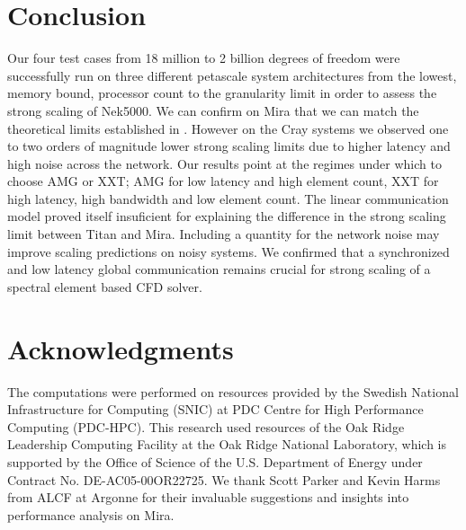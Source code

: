 \documentclass{sig-alternate}
\begin{document}
\section{Conclusion}
Our four test cases from 18 million to 2 billion degrees of freedom were
successfully run on three different petascale system architectures from the
lowest, memory bound, processor count to the granularity limit in order to
assess the strong scaling of Nek5000. We can confirm on Mira that  we can match the theoretical limits established in \cite{fischer:scaling}. However on the Cray systems we observed one to two orders of magnitude
lower strong scaling limits due to higher
latency and high noise across the network. %
Our results point at the regimes under which to choose AMG or
XXT; AMG for low latency and high element count, XXT for high latency, high
bandwidth and low element count. The linear communication model proved itself insuficient for explaining the difference in
the strong scaling limit between Titan and Mira. Including a 
quantity for the network noise may improve scaling predictions on noisy systems.
We confirmed that a synchronized and low latency global communication remains crucial for strong scaling of a spectral element based CFD solver.

\section{Acknowledgments}
The computations were performed on resources provided by the Swedish National 
Infrastructure for Computing (SNIC) at PDC Centre for High Performance Computing (PDC-HPC).
This research used resources of the Oak Ridge Leadership Computing Facility at 
the Oak Ridge National Laboratory, which is supported by the Office of Science of 
the U.S. Department of Energy under Contract No. DE-AC05-00OR22725. 
We thank Scott Parker and Kevin Harms from ALCF at Argonne for their invaluable
suggestions and insights into performance analysis on Mira. 
%

%
%
\end{document}
